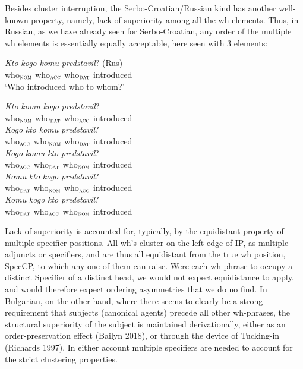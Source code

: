 \documentclass[output=paper,colorlinks,citecolor=brown,
]{langscibook}
\begin{document}
Besides cluster interruption, the Serbo-Croatian/Russian kind has another well-known property, namely, lack of superiority among all the wh-elements. Thus, in Russian, as we have already seen for Serbo-Croatian, any order of the multiple wh elements is essentially equally acceptable, here seen with 3 elements:

\begin{exe}
\ex \label{bai11}

\begin{xlist}
\ex \label{bai11a}
\gll \emph{Kto}		\emph{kogo}		\emph{komu}		\emph{predstavil}? \hfill (Rus) \\
who$_{\textsc{nom}}$ who$_{\textsc{acc}}$ who$_{\textsc{dat}}$ introduced \\
\glt `Who introduced who to whom?'

\ex \label{bai11b}
\gll \emph{Kto}			\emph{komu}	\emph{kogo}		\emph{predstavil}? \\
who$_{\textsc{nom}}$  who$_{\textsc{dat}}$ who$_{\textsc{acc}}$ introduced \\

\ex \label{bai11c}
\gll \emph{Kogo}	\emph{kto}			\emph{komu}		\emph{predstavil}? \\
who$_{\textsc{acc}}$ who$_{\textsc{nom}}$  who$_{\textsc{dat}}$  introduced \\

\ex \label{bai11d}
\gll \emph{Kogo}		\emph{komu}		\emph{kto}		\emph{predstavil}? \\
who$_{\textsc{acc}}$ who$_{\textsc{dat}}$  who$_{\textsc{nom}}$  introduced \\

\ex \label{bai11e}
\gll \emph{Komu}	\emph{kto}		\emph{kogo}		\emph{predstavil}? \\
who$_{\textsc{dat}}$  who$_{\textsc{nom}}$ who$_{\textsc{acc}}$  introduced \\

\ex \label{bai11f}
\gll \emph{Komu}	\emph{kogo}	\emph{kto}		\emph{predstavil}? \\
who$_{\textsc{dat}}$  who$_{\textsc{acc}}$   who$_{\textsc{nom}}$ introduced \\

\end{xlist}
\end{exe}

Lack of superiority is accounted for, typically, by the equidistant property of multiple specifier positions. All wh’s cluster on the left edge of IP, as multiple adjuncts or specifiers, and are thus all equidistant from the true wh position, SpecCP, to which any one of them can raise. Were each wh-phrase to occupy a distinct Specifier of a distinct head, we would not expect equidistance to apply, and would therefore expect ordering asymmetries that we do no find. In Bulgarian, on the other hand, where there seems to clearly be a strong requirement that subjects (canonical agents) precede all other wh-phrases, the structural superiority of the subject is maintained derivationally, either as an order-preservation effect (Bailyn 2018), or through the device of Tucking-in (Richards 1997).  In either account multiple specifiers are needed to account for the strict clustering properties. 
\end{document}
